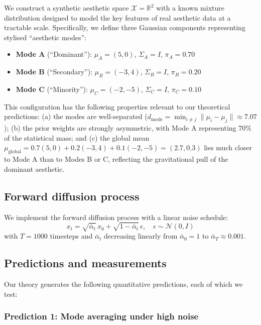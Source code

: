 \documentclass[11pt]{article}
\begin{document}
We construct a synthetic aesthetic space $\mathcal{X} = \mathbb{R}^2$ with a known mixture distribution designed to model the key features of real aesthetic data at a tractable scale. Specifically, we define three Gaussian components representing stylised ``aesthetic modes'':

\begin{itemize}
 \item \textbf{Mode A} (``Dominant''): $\mu_A = (5, 0)$, $\Sigma_A = I$, $\pi_A = 0.70$
 \item \textbf{Mode B} (``Secondary''): $\mu_B = (-3, 4)$, $\Sigma_B = I$, $\pi_B = 0.20$
 \item \textbf{Mode C} (``Minority''): $\mu_C = (-2, -5)$, $\Sigma_C = I$, $\pi_C = 0.10$
\end{itemize}

This configuration has the following properties relevant to our theoretical predictions: (a) the modes are well-separated ($d_{\mathrm{mode}} = \min_{i \neq j}\|\mu_i - \mu_j\| \approx 7.07$); (b) the prior weights are strongly asymmetric, with Mode A representing 70\% of the statistical mass; and (c) the global mean $\mu_{\mathrm{global}} = 0.7(5,0) + 0.2(-3,4) + 0.1(-2,-5) = (2.7, 0.3)$ lies much closer to Mode A than to Modes B or C, reflecting the gravitational pull of the dominant aesthetic.

\subsection{Forward diffusion process}

We implement the forward diffusion process with a linear noise schedule:
$$x_t = \sqrt{\bar{\alpha}_t}\, x_0 + \sqrt{1 - \bar{\alpha}_t}\, \epsilon, \quad \epsilon \sim \mathcal{N}(0, I)$$
with $T = 1000$ timesteps and $\bar{\alpha}_t$ decreasing linearly from $\bar{\alpha}_0 = 1$ to $\bar{\alpha}_T \approx 0.001$.

\subsection{Predictions and measurements}

Our theory generates the following quantitative predictions, each of which we test:

\subsubsection{Prediction 1: Mode averaging under high noise}
\end{document}
